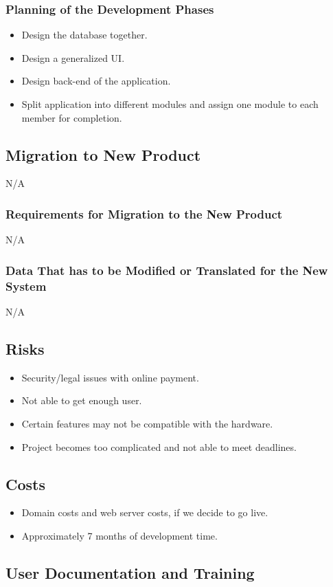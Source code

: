 \documentclass[12pt, titlepage]{article}
\begin{document}
{\subsubsection{Planning of the Development Phases}
\begin{itemize}
    \item Design the database together.
    \item Design a generalized UI.
    \item Design back-end of the application.
    \item Split application into different modules and assign one module to each 
member for completion.
    
\end{itemize}
\subsection{Migration to New Product}
N/A
\subsubsection{Requirements for Migration to the New Product}
N/A
\subsubsection{Data That has to be Modified or Translated for the New System}
N/A
\subsection{Risks}
\begin{itemize}
  \item Security/legal issues with online payment.
  \item Not able to get enough user.
  \item Certain features may not be compatible with the hardware.
  \item Project becomes too complicated and not able to meet deadlines.
\end{itemize}
\subsection{Costs}
\begin{itemize}
  \item Domain costs and web server costs, if we decide to go live.
  \item Approximately 7 months of development time.
\end{itemize}
\subsection{User Documentation and Training}
}
\end{document}
